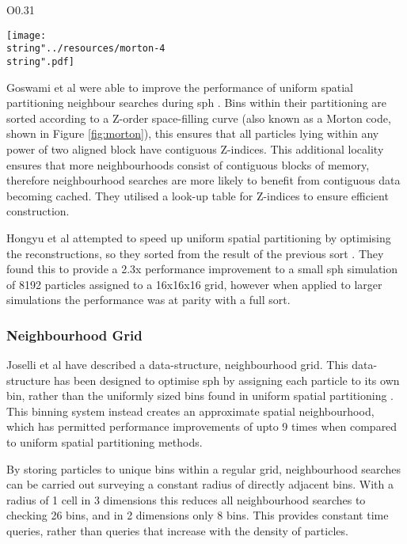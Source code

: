 \begin{wrapfigure}{O}{0.31\columnwidth}%
  \begin{centering}
  \texttt{[image: \\string"../resources/morton-4\\string".pdf]}
  \par\end{centering}
  \protect\caption{\label{fig:morton}A level 4 Z-order curve (Morton code) in 2 dimensions.}
\end{wrapfigure}%

      Goswami et al were able to improve the performance of uniform spatial partitioning neighbour searches during \gls{sph} \cite{GS*10}. Bins within their partitioning are sorted according to a Z-order space-filling curve (also known as a Morton code, shown in Figure \ref{fig:morton}), this ensures that all particles lying within any power of two aligned block have contiguous Z-indices. This additional locality ensures that more neighbourhoods consist of contiguous blocks of memory, therefore neighbourhood searches are more likely to benefit from contiguous data becoming cached. They utilised a look-up table for Z-indices to ensure efficient construction.
  
      Hongyu et al attempted to speed up uniform spatial partitioning by optimising the reconstructions, so they sorted from the result of the previous sort \cite{HY*15}. They found this to provide a 2.3x performance improvement to a small \gls{sph} simulation of 8192 particles assigned to a 16x16x16 grid, however when applied to larger simulations the performance was at parity with a full sort.
      
    \subsubsection*{Neighbourhood Grid}
      Joselli et al have described a data-structure, neighbourhood grid. This data-structure has been designed to optimise \gls{sph} by assigning each particle to its own bin, rather than the uniformly sized bins found in uniform spatial partitioning \cite{JR*15}. This binning system instead creates an approximate spatial neighbourhood, which has permitted performance improvements of upto 9 times when compared to uniform spatial partitioning methods.
      
      By storing particles to unique bins within a regular grid, neighbourhood searches can be carried out surveying a constant radius of directly adjacent bins. With a radius of 1 cell in 3 dimensions this reduces all neighbourhood searches to checking 26 bins, and in 2 dimensions only 8 bins. This provides constant time queries, rather than queries that increase with the density of particles.


